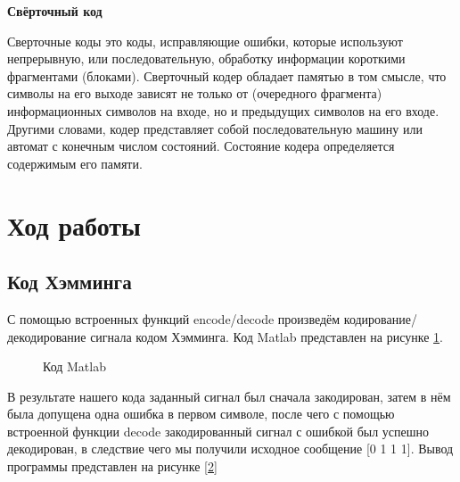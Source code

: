 \documentclass[a4paper,14pt]{extarticle}
\begin{document}
\textbf{Свёрточный код}

Сверточные коды это коды, исправляющие ошибки, которые используют непрерывную, или последовательную, обработку информации короткими фрагментами (блоками). Сверточный кодер обладает памятью в том смысле, что символы на его выходе зависят не только от (очередного фрагмента) информационных символов на входе, но и предыдущих символов на его входе. Другими словами, кодер представляет со­бой последовательную машину или автомат с конечным числом состояний. Состояние кодера определяется содержимым его памяти.

\newpage
\section{Ход работы}

\subsection{Код Хэмминга}

С помощью встроенных функций encode/decode произведём кодирование/декодирование сигнала кодом Хэмминга.
Код Matlab представлен на рисунке \ref{1}.

\begin{figure}[H]
\caption{Код Matlab}
\label{1}
\end{figure}

В результате нашего кода заданный сигнал был сначала закодирован, затем в нём была допущена одна ошибка в первом символе, после чего с помощью встроенной функции decode закодированный сигнал с ошибкой был успешно декодирован, в следствие чего мы получили исходное сообщение [0 1 1 1]. Вывод программы представлен на рисунке \ref{2}
\end{document}
